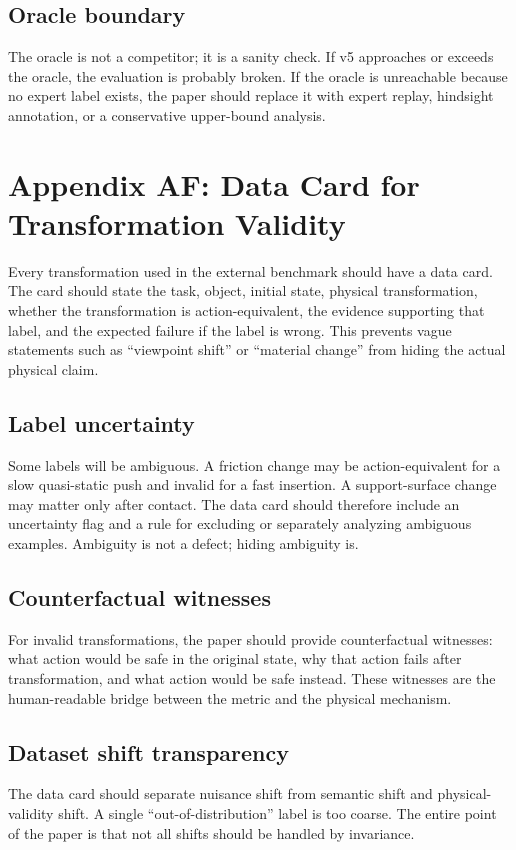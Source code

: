 \documentclass{article}
\begin{document}
\subsection{Oracle boundary}
The oracle is not a competitor; it is a sanity check. If v5 approaches or exceeds the oracle, the evaluation is probably broken. If the oracle is unreachable because no expert label exists, the paper should replace it with expert replay, hindsight annotation, or a conservative upper-bound analysis.


\section{Appendix AF: Data Card for Transformation Validity}
Every transformation used in the external benchmark should have a data card. The card should state the task, object, initial state, physical transformation, whether the transformation is action-equivalent, the evidence supporting that label, and the expected failure if the label is wrong. This prevents vague statements such as ``viewpoint shift'' or ``material change'' from hiding the actual physical claim.

\subsection{Label uncertainty}
Some labels will be ambiguous. A friction change may be action-equivalent for a slow quasi-static push and invalid for a fast insertion. A support-surface change may matter only after contact. The data card should therefore include an uncertainty flag and a rule for excluding or separately analyzing ambiguous examples. Ambiguity is not a defect; hiding ambiguity is.

\subsection{Counterfactual witnesses}
For invalid transformations, the paper should provide counterfactual witnesses: what action would be safe in the original state, why that action fails after transformation, and what action would be safe instead. These witnesses are the human-readable bridge between the metric and the physical mechanism.

\subsection{Dataset shift transparency}
The data card should separate nuisance shift from semantic shift and physical-validity shift. A single ``out-of-distribution'' label is too coarse. The entire point of the paper is that not all shifts should be handled by invariance.
\end{document}
